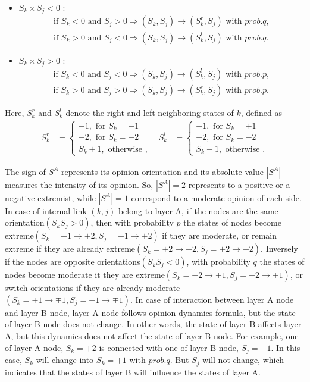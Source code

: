 \documentclass[english]{cccconf}
\begin{document}
\begin{itemize}
\item $S_k \times S_j < 0$ :
\begin{align*}
\mbox{if } S_k<0 \mbox{ and } S_j>0  \Rightarrow (S_k, S_j) \rightarrow (S_k^r, S_j) \mbox{ with } prob.q,\\
\mbox{if } S_k>0 \mbox{ and } S_j<0  \Rightarrow (S_k, S_j) \rightarrow (S_k^l, S_j) \mbox{ with } prob.q.
\end{align*}
\item $S_k \times S_j > 0$ :
\begin{align*}
\mbox{if } S_k<0 \mbox{ and } S_j<0  \Rightarrow (S_k, S_j) \rightarrow (S_k^l, S_j) \mbox{ with } prob.p,\\
\mbox{if } S_k>0 \mbox{ and } S_j>0  \Rightarrow (S_k, S_j) \rightarrow (S_k^r, S_j) \mbox{ with } prob.p.
\end{align*}
\end{itemize}
Here, $S_k^r$ and $S_k^l$ denote the right and left neighboring states of $k$, defined as
\begin{align*}
S_k^r &= \left\{\begin{matrix}
+1,\mbox{ for } S_k = -1\\
+2,\mbox{ for } S_k = +2\\ 
S_k + 1,\mbox{ otherwise }, 
\end{matrix}\right. &
S_k^l &= \left\{\begin{matrix}
-1,\mbox{ for } S_k= +1
\\ -2,\mbox{ for } S_k=-2
\\ S_k - 1,\mbox{ otherwise }.
\end{matrix}\right.
\end{align*}


The sign of $S^A$ represents its opinion orientation and its absolute value $|S^A|$ measures the intensity of its opinion. So, $|S^A|=2$ represents to a positive or a negative extremist, while  $|S^A|=1$ correspond to a moderate opinion of each side. In case of internal link $(k, j)$ belong to layer A, if the nodes are the same orientation$(S_kS_j>0)$, then with probability $p$ the states of nodes become extreme$(S_k=\pm1 \rightarrow \pm2, S_j= \pm1 \rightarrow \pm2)$ if they are moderate, or remain extreme if they are already extreme$(S_k=\pm2 \rightarrow \pm2, S_j= \pm2 \rightarrow \pm2)$. Inversely if the nodes are opposite orientations$(S_kS_j<0)$, with probability $q$ the states of nodes become moderate it they are extreme$(S_k=\pm2 \rightarrow \pm1, S_j= \pm2 \rightarrow \pm1)$, or switch orientations if they are already moderate$(S_k=\pm1 \rightarrow \mp1, S_j= \pm1 \rightarrow \mp1)$.  In case of interaction between layer A node and layer B node, layer A node follows opinion dynamics formula, but the state of layer B node does not change. In other words, the state of layer B affects layer A, but this dynamics does not affect the state of layer B node. For example, one of layer A node, $S_k = +2$ is connected with one of layer B node, $S_j = -1$. In this case, $S_k$ will change into $S_k = +1$ with $prob.q$. But $S_j$ will not change, which indicates that the states of layer B will influence the states of layer A.
\end{document}
